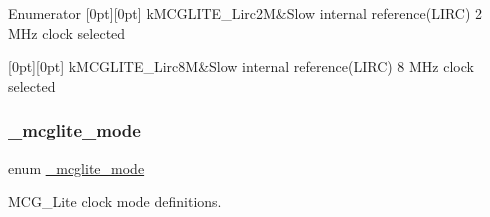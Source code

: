 \begin{DoxyEnumFields}{Enumerator}
[0pt][0pt]{}\mbox{\label{group__clock_ggab91799aa690e0aca9897dbc4887c3945aecc45f9cd9d72b7cb5372bc28d59d813}} 
k\+M\+C\+G\+L\+I\+T\+E\+\_\+\+Lirc2M&Slow internal reference(\+L\+I\+R\+C) 2 M\+Hz clock selected \\
\hline

[0pt][0pt]{}\mbox{\label{group__clock_ggab91799aa690e0aca9897dbc4887c3945a1db861733d215202c2759ca36c2d9a1d}} 
k\+M\+C\+G\+L\+I\+T\+E\+\_\+\+Lirc8M&Slow internal reference(\+L\+I\+R\+C) 8 M\+Hz clock selected \\
\hline

\end{DoxyEnumFields}
\mbox{\label{group__clock_ga11d70560b1f08560bba4d6fbb649c6da}} 
\subsubsection{\texorpdfstring{\_mcglite\_mode}{\_mcglite\_mode}}
{\footnotesize\ttfamily enum \mbox{\hyperlink{group__clock_ga11d70560b1f08560bba4d6fbb649c6da}{\+\_\+mcglite\+\_\+mode}}}



M\+C\+G\+\_\+\+Lite clock mode definitions. 

